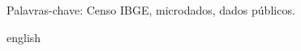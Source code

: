 \setlength{\absparsep}{18pt} 
\begin{resumo}[Resumo]


 

 Palavras-chave: Censo IBGE, microdados, dados públicos.
\end{resumo}

\begin{resumo}[Abstract]
 \begin{otherlanguage*}{english}




 \end{otherlanguage*}

\end{resumo}